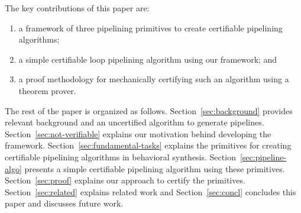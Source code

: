 
\medskip
The key contributions of this paper are:
\begin{enumerate}
\item a framework of three pipelining primitives to create certifiable pipelining algorithms;
\item a simple certifiable loop pipelining algorithm using our framework; and 
\item a proof methodology for mechanically certifying such an algorithm using a theorem prover.
\end{enumerate}


The rest of the paper is organized as
follows. Section~\ref{sec:background} provides relevant background and an uncertified algorithm to generate
pipelines. Section~\ref{sec:not-verifiable} explains our motivation behind developing the framework. Section~\ref{sec:fundamental-tasks} explains the primitives for creating certifiable
pipelining algorithms in behavioral
synthesis. Section~\ref{sec:pipeline-algo} presents a simple certifiable pipelining algorithm using these primitives. Section~\ref{sec:proof}
explains our approach to certify the primitives. Section~\ref{sec:related} explains related work and Section~\ref{sec:concl} concludes this paper and discusses future work.


